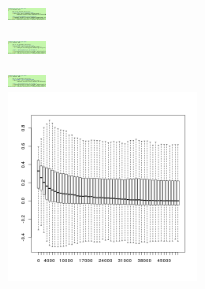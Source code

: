 \documentclass[final]{beamer}
\begin{document}
\begin{frame}
	\begin{center}
		\includegraphics[width=1cm]{./codePrices.png}\\
	\end{center}

	\begin{center}

		\includegraphics[width=1cm]{./codeNeeds.png}\\
	\end{center}
	\begin{center}

		\includegraphics[width=1cm]{./codeNeeds.png}\\
		\includegraphics[width=5cm]{./NonEquilibrium.png}
	\end{center}




\end{frame}
\end{document}
